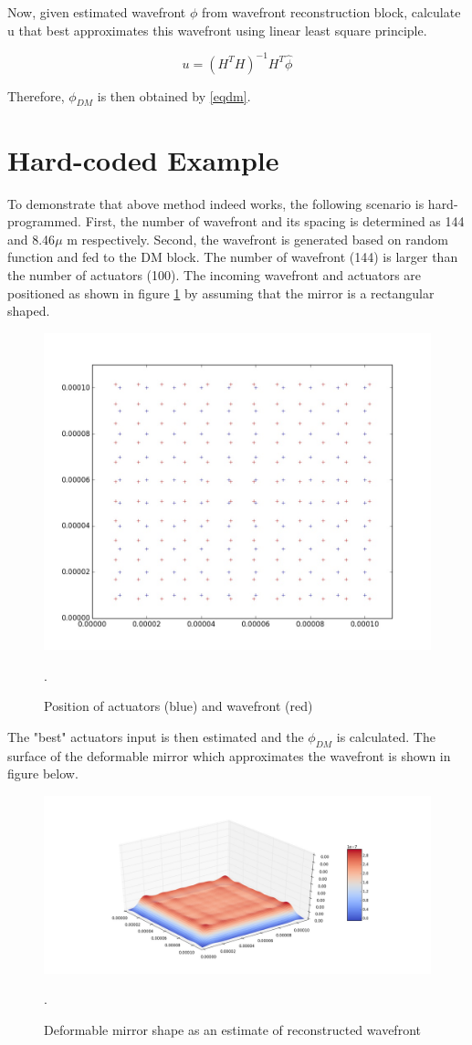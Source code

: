 \documentclass[]{article}
\begin{document}
Now, given estimated wavefront $ \phi $ from wavefront reconstruction block, calculate u that best approximates this wavefront using linear least square principle.

\begin{equation}
u = (H^TH)^{-1}H^T\hat{\phi}
\end{equation}

Therefore, $ \phi_{DM} $ is then obtained by \ref{eqdm}.

\section{Hard-coded Example}

To demonstrate that above method indeed works, the following scenario is hard-programmed. First, the number of wavefront and its spacing is determined as 144 and 8.46$ \mu $ m respectively. Second, the wavefront is generated based on random function and fed to the DM block. The number of wavefront (144) is larger than the number of actuators (100). The incoming wavefront and actuators are positioned as shown in figure \ref{fig2} by assuming that the mirror is a rectangular shaped.

\begin{figure}[h!]
\centering
\includegraphics[width=0.7\linewidth]{fig2}
\caption{Position of actuators (blue) and wavefront (red)}.
\label{fig2}
\end{figure}

The "best" actuators input is then estimated and the $ \phi_{DM} $ is calculated. The surface of the deformable mirror which approximates the wavefront is shown in figure below.

\begin{figure}[h!]
\centering
\includegraphics[width=1\linewidth]{fig3}
\caption{Deformable mirror shape as an estimate of reconstructed wavefront}.
\label{fig3}
\end{figure}
\end{document}
